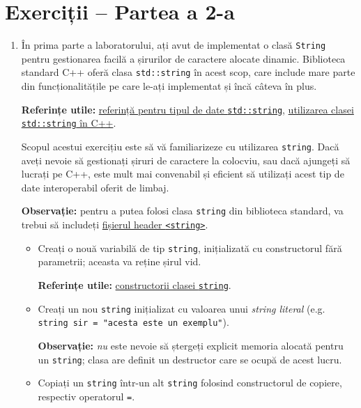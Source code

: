 \section*{Exerciții -- Partea a 2-a}

\begin{enumerate}
    \item În prima parte a laboratorului, ați avut de implementat o clasă \texttt{String} pentru gestionarea facilă a șirurilor de caractere alocate dinamic. Biblioteca standard C++ oferă clasa \texttt{std::string} în acest scop, care include mare parte din funcționalitățile pe care le-ați implementat și încă câteva în plus.

    \textbf{Referințe utile:} \href{https://cplusplus.com/reference/string/string/}{referință pentru tipul de date \texttt{std::string}}, \href{https://www.geeksforgeeks.org/stdstring-class-in-c/}{utilizarea clasei \texttt{std::string} în C++}.

    Scopul acestui exercițiu este să vă familiarizeze cu utilizarea \texttt{string}. Dacă aveți nevoie să gestionați șiruri de caractere la colocviu, sau dacă ajungeți să lucrați pe C++, este mult mai convenabil și eficient să utilizați acest tip de date interoperabil oferit de limbaj.

    \textbf{Observație:} pentru a putea folosi clasa \texttt{string} din biblioteca standard, va trebui să includeți \href{https://en.cppreference.com/w/cpp/header/string}{fișierul header \texttt{<string>}}.

    \begin{itemize}
        \item Creați o nouă variabilă de tip \texttt{string}, inițializată cu constructorul fără parametrii; aceasta va reține șirul vid.

        \textbf{Referințe utile:} \href{https://cplusplus.com/reference/string/string/string/}{constructorii clasei \texttt{string}}.

        \item Creați un nou \texttt{string} inițializat cu valoarea unui \textit{string literal} (e.g. \texttt{string sir = "acesta este un exemplu"}).

        \textbf{Observație:} \emph{nu} este nevoie să ștergeți explicit memoria alocată pentru un \texttt{string}; clasa are definit un destructor care se ocupă de acest lucru.

        \item Copiați un \texttt{string} într-un alt \texttt{string} folosind constructorul de copiere, respectiv operatorul \texttt{=}.


\end{itemize}
\end{enumerate}
